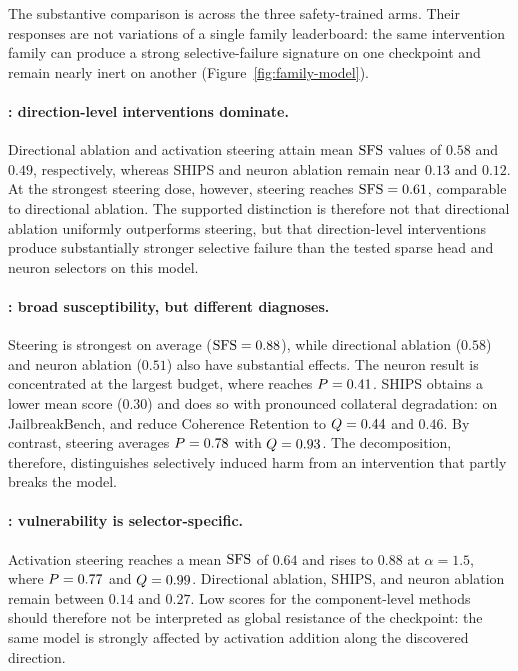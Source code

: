 The substantive comparison is across the three safety-trained arms. Their responses are not variations of a single family leaderboard: the same intervention family can produce a strong selective-failure signature on one checkpoint and remain nearly inert on another (Figure~\ref{fig:family-model}).

\paragraph{: direction-level interventions dominate.}
Directional ablation and activation steering attain mean $\mathrm{SFS}$ values of $0.58$ and $0.49$, respectively, whereas SHIPS and neuron ablation remain near
$0.13$ and $0.12$. At the strongest steering dose, however, steering reaches $\mathrm{SFS}=0.61$, comparable to directional ablation. The supported distinction is
therefore not that directional ablation uniformly outperforms steering, but that direction-level interventions produce substantially stronger selective
failure than the tested sparse head and neuron selectors on this model.

\paragraph{: broad susceptibility, but different diagnoses.}
Steering is strongest on average ($\mathrm{SFS}=0.88$), while directional ablation ($0.58$) and neuron ablation ($0.51$) also have substantial effects. The neuron
result is concentrated at the largest budget, where  reaches $P=0.41$. SHIPS obtains a lower mean score ($0.30$) and does so with pronounced collateral degradation: on JailbreakBench,  and  reduce Coherence Retention to $Q=0.44$ and $0.46$. By contrast, steering averages $P=0.78$ with $Q=0.93$. The decomposition, therefore, distinguishes selectively induced harm from an intervention that partly breaks the model.

\paragraph{: vulnerability is selector-specific.}
Activation steering reaches a mean $\mathrm{SFS}$ of $0.64$ and rises to $0.88$ at $\alpha=1.5$, where $P=0.77$ and $Q=0.99$. Directional ablation, SHIPS,
and neuron ablation remain between $0.14$ and $0.27$. Low scores for the component-level methods should therefore not be interpreted as global resistance of the checkpoint: the same model is strongly affected by activation addition along the discovered direction.

